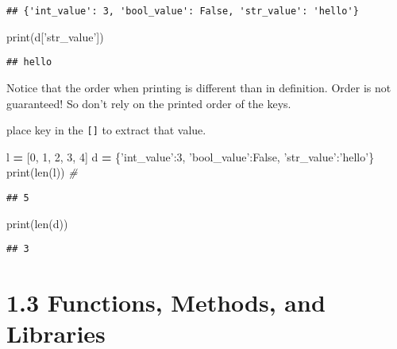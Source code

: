 \documentclass[]{book}
\newenvironment{Shaded}{\begin{snugshade}}{\end{snugshade}}
\newcommand{\BuiltInTok}[1]{#1}
\newcommand{\CommentTok}[1]{\textcolor[rgb]{0.56,0.35,0.01}{\textit{#1}}}
\newcommand{\DecValTok}[1]{\textcolor[rgb]{0.00,0.00,0.81}{#1}}
\newcommand{\NormalTok}[1]{#1}
\newcommand{\OperatorTok}[1]{\textcolor[rgb]{0.81,0.36,0.00}{\textbf{#1}}}
\newcommand{\StringTok}[1]{\textcolor[rgb]{0.31,0.60,0.02}{#1}}
\newcommand{\VariableTok}[1]{\textcolor[rgb]{0.00,0.00,0.00}{#1}}
\theoremstyle{definition}
\theoremstyle{definition}
\theoremstyle{definition}
\theoremstyle{remark}
\begin{document}
\begin{verbatim}
## {'int_value': 3, 'bool_value': False, 'str_value': 'hello'}
\end{verbatim}

\begin{Shaded}
\begin{Highlighting}[]
\BuiltInTok{print}\NormalTok{(d[}\StringTok{'str_value'}\NormalTok{])}
\end{Highlighting}
\end{Shaded}

\begin{verbatim}
## hello
\end{verbatim}

Notice that the order when printing is different than in definition.
Order is not guaranteed! So don't rely on the printed order of the keys.

place key in the \texttt{{[}{]}} to extract that value.

\begin{Shaded}
\begin{Highlighting}[]
\NormalTok{l }\OperatorTok{=}\NormalTok{ [}\DecValTok{0}\NormalTok{, }\DecValTok{1}\NormalTok{, }\DecValTok{2}\NormalTok{, }\DecValTok{3}\NormalTok{, }\DecValTok{4}\NormalTok{]}
\NormalTok{d }\OperatorTok{=}\NormalTok{ \{}\StringTok{'int_value'}\NormalTok{:}\DecValTok{3}\NormalTok{, }\StringTok{'bool_value'}\NormalTok{:}\VariableTok{False}\NormalTok{, }\StringTok{'str_value'}\NormalTok{:}\StringTok{'hello'}\NormalTok{\}}
\BuiltInTok{print}\NormalTok{(}\BuiltInTok{len}\NormalTok{(l)) }\CommentTok{# }
\end{Highlighting}
\end{Shaded}

\begin{verbatim}
## 5
\end{verbatim}

\begin{Shaded}
\begin{Highlighting}[]
\BuiltInTok{print}\NormalTok{(}\BuiltInTok{len}\NormalTok{(d))}
\end{Highlighting}
\end{Shaded}

\begin{verbatim}
## 3
\end{verbatim}

\hypertarget{functions-methods-and-libraries}{%
\section{1.3 Functions, Methods, and
Libraries}\label{functions-methods-and-libraries}}
\end{document}
